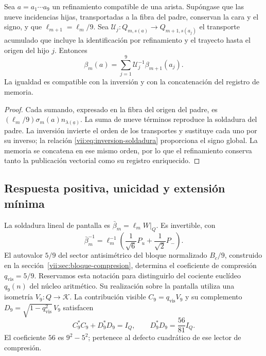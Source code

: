 \begin{proposition}
\label{vii:prop:refinamiento-soldadura}
Sea \(a=a_1\cdots a_9\) un refinamiento compatible de una arista.
Supóngase que las nueve incidencias hijas, transportadas a la fibra del
padre, conservan la cara y el signo, y que
\(\ell_{m+1}=\ell_m/9\). Sea
\(\mathcal U_j:Q_{m,s(a)}\longrightarrow Q_{m+1,s(a_j)}\)
el transporte acumulado que incluye la identificación por refinamiento
y el trayecto hasta el origen del hijo \(j\). Entonces
\[
 \beta_m(a)=
 \sum_{j=1}^{9}\mathcal U_j^{-1}\beta_{m+1}(a_j).
\]
La igualdad es compatible con la inversión y con la concatenación
del registro de memoria.
\end{proposition}

\begin{proof}
Cada sumando, expresado en la fibra del origen del padre, es
\((\ell_m/9)\sigma_m(a)n_{\lambda(\underline a)}\).
La suma de nueve términos reproduce la soldadura del padre.
La inversión invierte el orden de los transportes y sustituye cada uno
por su inverso; la relación \eqref{vii:eq:inversion-soldadura} proporciona
el signo global. La memoria se concatena en ese mismo orden, por lo
que el refinamiento conserva tanto la publicación vectorial como su
registro enriquecido.
\end{proof}

\subsection{Respuesta positiva, unicidad y extensión mínima}
\label{vii:sec:respuesta-positiva}

La soldadura lineal de pantalla es
\(\bar\beta_m=\ell_mW|_Q\). Es invertible, con
\[
 \bar\beta_m^{-1}
 =\ell_m^{-1}\left(\frac1{\sqrt6}P_u+\frac1{\sqrt2}P_-\right).
\]
El autovalor \(5/9\) del sector antisimétrico del bloque normalizado
\(B_c/9\), construido en la sección~\ref{vii:sec:bloque-compresion},
determina el coeficiente de
compresión \(q_{\mathrm{vis}}=5/9\). Reservamos esta notación para
distinguirlo del cociente euclídeo \(q_9(n)\) del núcleo aritmético.
Su realización sobre la pantalla utiliza una isometría
\(V_9:Q\longrightarrow\mathcal K\). La contribución visible
\(C_9=q_{\mathrm{vis}}V_9\) y su complemento
\(D_9=\sqrt{1-q_{\mathrm{vis}}^2}\,V_9\) satisfacen
\[
 C_9^*C_9+D_9^*D_9=I_Q,\qquad D_9^*D_9=\frac{56}{81}I_Q.
\]
El coeficiente \(56\) es \(9^2-5^2\); pertenece al defecto cuadrático
de ese lector de compresión.

